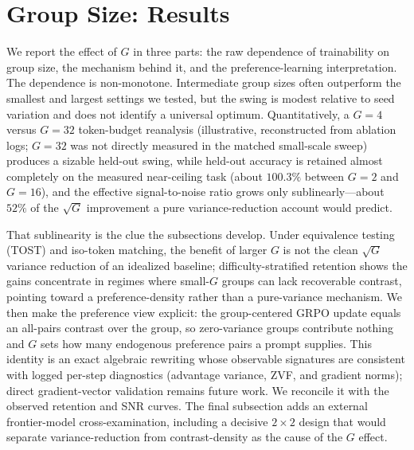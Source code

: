 \section{Group Size: Results}
\label{sec:p3-results}
We report the effect of $G$ in three parts: the raw dependence of trainability on
group size, the mechanism behind it, and the preference-learning interpretation.
The dependence is non-monotone. Intermediate group sizes often outperform the
smallest and largest settings we tested, but the swing is modest relative to
seed variation and does not identify a universal optimum. Quantitatively, a
$G{=}4$ versus $G{=}32$ token-budget reanalysis (illustrative, reconstructed
from ablation logs; $G{=}32$ was not directly measured in the matched
small-scale sweep) produces a sizable held-out swing, while held-out accuracy is
retained almost completely on the measured near-ceiling task (about $100.3\%$
between $G{=}2$ and $G{=}16$), and the effective signal-to-noise ratio grows only sublinearly---about
$52\%$ of the $\sqrt{G}$ improvement a pure variance-reduction account would
predict.

That sublinearity is the clue the subsections develop. Under equivalence testing
(TOST) and iso-token matching, the benefit of larger $G$ is not the clean
$\sqrt{G}$ variance reduction of an idealized baseline; difficulty-stratified
retention shows the gains concentrate in regimes where small-$G$ groups can lack
recoverable contrast, pointing toward a preference-density rather than a
pure-variance mechanism. We then
make the preference view explicit: the group-centered GRPO update equals an
all-pairs contrast over the group, so zero-variance groups contribute nothing and
$G$ sets how many endogenous preference pairs a prompt supplies. This identity is
an exact algebraic rewriting whose observable signatures are consistent with
logged per-step diagnostics (advantage variance, ZVF, and gradient norms);
direct gradient-vector validation remains future work. We reconcile it with the
observed retention and SNR curves. The final subsection adds an external frontier-model
cross-examination, including a decisive $2{\times}2$ design that would separate
variance-reduction from contrast-density as the cause of the $G$ effect.
